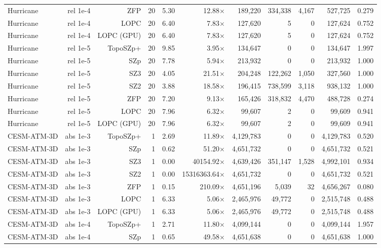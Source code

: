 \begin{tabular}{lrrrrrrrrrr}
Hurricane & rel 1e-4 & ZFP & 20 & 5.30 & 12.88$\times$ & 189,220 & 334,338 & 4,167 & 527,725 & 0.279 \\
Hurricane & rel 1e-4 & LOPC & 20 & 6.40 & 7.83$\times$ & 127,620 & 5 & 0 & 127,624 & 0.752 \\
Hurricane & rel 1e-4 & LOPC (GPU) & 20 & 6.40 & 7.83$\times$ & 127,620 & 5 & 0 & 127,624 & 0.752 \\
Hurricane & rel 1e-5 & TopoSZp+ & 20 & 9.85 & 3.95$\times$ & 134,647 & 0 & 0 & 134,647 & 1.997 \\
Hurricane & rel 1e-5 & SZp & 20 & 7.78 & 5.94$\times$ & 213,932 & 0 & 0 & 213,932 & 1.000 \\
Hurricane & rel 1e-5 & SZ3 & 20 & 4.05 & 21.51$\times$ & 204,248 & 122,262 & 1,050 & 327,560 & 1.000 \\
Hurricane & rel 1e-5 & SZ2 & 20 & 3.88 & 18.58$\times$ & 196,415 & 738,599 & 3,118 & 938,132 & 1.000 \\
Hurricane & rel 1e-5 & ZFP & 20 & 7.20 & 9.13$\times$ & 165,426 & 318,832 & 4,470 & 488,728 & 0.274 \\
Hurricane & rel 1e-5 & LOPC & 20 & 7.96 & 6.32$\times$ & 99,607 & 2 & 0 & 99,609 & 0.941 \\
Hurricane & rel 1e-5 & LOPC (GPU) & 20 & 7.96 & 6.32$\times$ & 99,607 & 2 & 0 & 99,609 & 0.941 \\
CESM-ATM-3D & abs 1e-3 & TopoSZp+ & 1 & 2.69 & 11.89$\times$ & 4,129,783 & 0 & 0 & 4,129,783 & 0.520 \\
CESM-ATM-3D & abs 1e-3 & SZp & 1 & 0.62 & 51.20$\times$ & 4,651,732 & 0 & 0 & 4,651,732 & 0.521 \\
CESM-ATM-3D & abs 1e-3 & SZ3 & 1 & 0.00 & 40154.92$\times$ & 4,639,426 & 351,147 & 1,528 & 4,992,101 & 0.934 \\
CESM-ATM-3D & abs 1e-3 & SZ2 & 1 & 0.00 & 15316363.64$\times$ & 4,651,732 & 0 & 0 & 4,651,732 & 0.521 \\
CESM-ATM-3D & abs 1e-3 & ZFP & 1 & 0.15 & 210.09$\times$ & 4,651,196 & 5,039 & 32 & 4,656,267 & 0.080 \\
CESM-ATM-3D & abs 1e-3 & LOPC & 1 & 6.33 & 5.06$\times$ & 2,465,976 & 49,772 & 0 & 2,515,748 & 0.488 \\
CESM-ATM-3D & abs 1e-3 & LOPC (GPU) & 1 & 6.33 & 5.06$\times$ & 2,465,976 & 49,772 & 0 & 2,515,748 & 0.488 \\
CESM-ATM-3D & abs 1e-4 & TopoSZp+ & 1 & 2.71 & 11.80$\times$ & 4,099,144 & 0 & 0 & 4,099,144 & 1.957 \\
CESM-ATM-3D & abs 1e-4 & SZp & 1 & 0.65 & 49.58$\times$ & 4,651,638 & 0 & 0 & 4,651,638 & 1.000 \\

\end{tabular}

